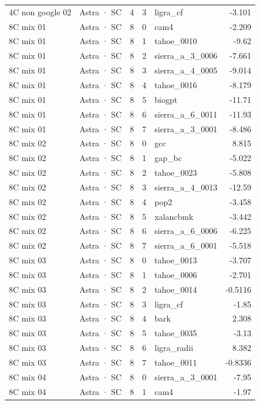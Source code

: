 \begin{tabular}{llrrlr}
4C non google 02 & Astra · SC & 4 & 3 & ligra\_cf & -3.101 \\
8C mix 01 & Astra · SC & 8 & 0 & cam4 & -2.209 \\
8C mix 01 & Astra · SC & 8 & 1 & tahoe\_0010 & -9.62 \\
8C mix 01 & Astra · SC & 8 & 2 & sierra\_a\_3\_0006 & -7.661 \\
8C mix 01 & Astra · SC & 8 & 3 & sierra\_a\_4\_0005 & -9.014 \\
8C mix 01 & Astra · SC & 8 & 4 & tahoe\_0016 & -8.179 \\
8C mix 01 & Astra · SC & 8 & 5 & biogpt & -11.71 \\
8C mix 01 & Astra · SC & 8 & 6 & sierra\_a\_6\_0011 & -11.93 \\
8C mix 01 & Astra · SC & 8 & 7 & sierra\_a\_3\_0001 & -8.486 \\
8C mix 02 & Astra · SC & 8 & 0 & gcc & 8.815 \\
8C mix 02 & Astra · SC & 8 & 1 & gap\_bc & -5.022 \\
8C mix 02 & Astra · SC & 8 & 2 & tahoe\_0023 & -5.808 \\
8C mix 02 & Astra · SC & 8 & 3 & sierra\_a\_4\_0013 & -12.59 \\
8C mix 02 & Astra · SC & 8 & 4 & pop2 & -3.458 \\
8C mix 02 & Astra · SC & 8 & 5 & xalancbmk & -3.442 \\
8C mix 02 & Astra · SC & 8 & 6 & sierra\_a\_6\_0006 & -6.225 \\
8C mix 02 & Astra · SC & 8 & 7 & sierra\_a\_6\_0001 & -5.518 \\
8C mix 03 & Astra · SC & 8 & 0 & tahoe\_0013 & -3.707 \\
8C mix 03 & Astra · SC & 8 & 1 & tahoe\_0006 & -2.701 \\
8C mix 03 & Astra · SC & 8 & 2 & tahoe\_0014 & -0.5116 \\
8C mix 03 & Astra · SC & 8 & 3 & ligra\_cf & -1.85 \\
8C mix 03 & Astra · SC & 8 & 4 & bark & 2.308 \\
8C mix 03 & Astra · SC & 8 & 5 & tahoe\_0035 & -3.13 \\
8C mix 03 & Astra · SC & 8 & 6 & ligra\_radii & 8.382 \\
8C mix 03 & Astra · SC & 8 & 7 & tahoe\_0011 & -0.8336 \\
8C mix 04 & Astra · SC & 8 & 0 & sierra\_a\_3\_0001 & -7.95 \\
8C mix 04 & Astra · SC & 8 & 1 & cam4 & -1.97 \\

\end{tabular}
